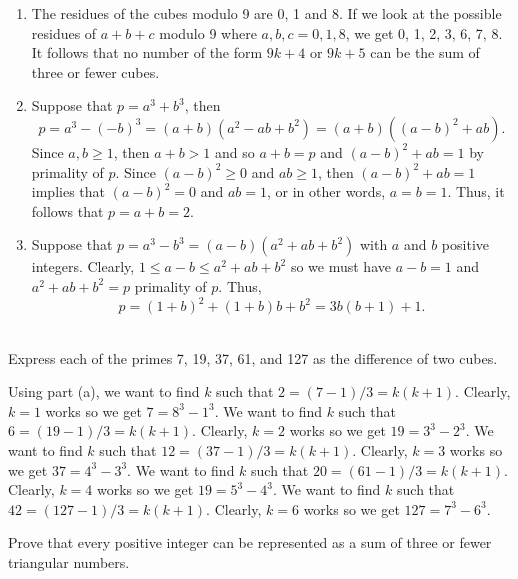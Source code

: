 \begin{solution}
    \begin{enumerate}
        \item The residues of the cubes modulo 9 are 0, 1 and 8. If we look at the possible residues of $a + b + c$ modulo 9 where $a,b,c = 0,1,8$, we get 0, 1, 2, 3, 6, 7, 8. It follows that no number of the form $9k + 4$ or $9k + 5$ can be the sum of three or fewer cubes.
        \item Suppose that $p = a^3 + b^3$, then
        $$p = a^3 - (-b)^3 = (a + b)(a^2 -ab + b^2) = (a + b)((a-b)^2 + ab).$$
        Since $a, b \geq 1$, then $a + b > 1$ and so $a + b = p$ and $(a-b)^2 + ab = 1$ by primality of $p$. Since $(a-b)^2 \geq 0$ and $ab \geq 1$, then $(a-b)^2 + ab = 1$ implies that $(a-b)^2 = 0$ and $ab = 1$, or in other words, $a = b = 1$. Thus, it follows that $p = a + b = 2$.
        \item Suppose that $p = a^3 - b^3 = (a-b)(a^2 + ab + b^2)$ with $a$ and $b$ positive integers. Clearly, $1 \leq a - b \leq a^2 + ab + b^2$ so we must have $a-b = 1$ and $a^2 + ab + b^2 = p$ primality of $p$. Thus,
        $$p = (1+ b)^2 + (1 + b)b + b^2 = 3b(b+1) + 1.$$ \\
    \end{enumerate}
\end{solution}

\begin{exercise}
    Express each of the primes 7, 19, 37, 61, and 127 as the difference of two cubes. \\
\end{exercise}

\begin{solution}
    Using part (a), we want to find $k$ such that $2 = (7-1)/3 = k(k+1)$. Clearly, $k = 1$ works so we get $7 = 8^3 - 1^3$. We want to find $k$ such that $6 = (19-1)/3 = k(k+1)$. Clearly, $k = 2$ works so we get $19 = 3^3 - 2^3$. We want to find $k$ such that $12 = (37-1)/3 = k(k+1)$. Clearly, $k = 3$ works so we get $37 = 4^3 - 3^3$. We want to find $k$ such that $20 = (61-1)/3 = k(k+1)$. Clearly, $k = 4$ works so we get $19 = 5^3 - 4^3$. We want to find $k$ such that $42 = (127-1)/3 = k(k+1)$. Clearly, $k = 6$ works so we get $127 = 7^3 - 6^3$.\\
\end{solution}

\begin{exercise}
    Prove that every positive integer can be represented as a sum of three or fewer triangular numbers.  \\
\end{exercise}

